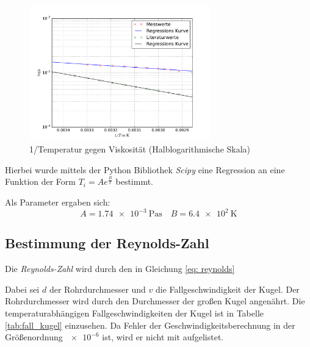 \begin{figure}
\centering
\includegraphics[width=0.7\textwidth]{pics/viskositaet_temp__log_mit_lit.pdf}
\caption{1/Temperatur gegen Viskosität (Halblogarithmische Skala)} %
\label{fig:t_v_l_v}
\end{figure}
\FloatBarrier

Hierbei wurde mittels der Python Bibliothek \emph{Scipy} eine
Regression an eine Funktion der Form $T_i = Ae^{\frac{B}{T}}$ bestimmt. %

Als Parameter ergaben sich:
\begin{equation*}
A=\SI{1.74e-3}{\pascal\second} \quad B=\SI{6.4e2}{\kelvin} %
\end{equation*}

\subsection{Bestimmung der Reynolds-Zahl}

Die \emph{Reynolds-Zahl} wird durch den in Gleichung \eqref{eq: reynolds} %

Dabei sei $d$ der Rohrdurchmesser und $v$ die Fallgeschwindigkeit der Kugel.
Der Rohrdurchmesser wird durch den Durchmesser der großen Kugel angenährt. %
Die temperaturabhängigen Fallgeschwindigkeiten der Kugel ist in Tabelle \ref{tab:fall_kugel} einzusehen.
Da Fehler der Geschwindigkeitsberechnung in der Größenordnung $\num{e-6}$ ist,
wird er nicht mit aufgelistet.


